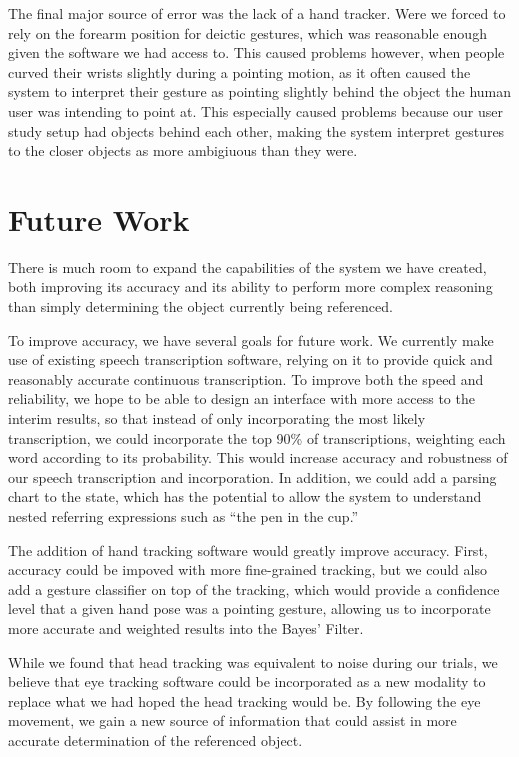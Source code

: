 \documentclass[a4paper, 11pt]{article} %
\begin{document}
The final major source of error was the lack of a hand tracker. Were we forced to rely on the forearm position for deictic gestures, which was reasonable enough given the software we had access to. This caused problems however, when people curved their wrists slightly during a pointing motion, as it often caused the system to interpret their gesture as pointing slightly behind the object the human user was intending to point at. This especially caused problems because our user study setup had objects behind each other, making the system interpret gestures to the closer objects as more ambigiuous than they were.

\section{Future Work}
There is much room to expand the capabilities of the system we have created, both improving its accuracy and its ability to perform more complex reasoning than simply determining the object currently being referenced.

To improve accuracy, we have several goals for future work. We currently make use of existing speech transcription software, relying on it to provide quick and reasonably accurate continuous transcription. To improve both the speed and reliability, we hope to be able to design an interface with more access to the interim results, so that instead of only incorporating the most likely transcription, we could incorporate the top 90\% of transcriptions, weighting each word according to its probability. This would increase accuracy and robustness of our speech transcription and incorporation. In addition, we could add a parsing chart to the state, which has the potential to allow the system to understand nested referring expressions such as ``the pen in the cup.''

The addition of hand tracking software would greatly improve accuracy. First, accuracy could be impoved with more fine-grained tracking, but we could also add a gesture classifier on top of the tracking, which would provide a confidence level that a given hand pose was a pointing gesture, allowing us to incorporate more accurate and weighted results into the Bayes' Filter.

While we found that head tracking was equivalent to noise during our trials, we believe that eye tracking software could be incorporated as a new modality to replace what we had hoped the head tracking would be. By following the eye movement, we gain a new source of information that could assist in more accurate determination of the referenced object.
\end{document}
